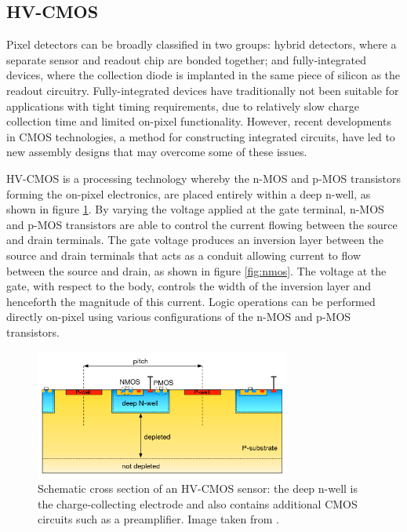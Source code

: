 \subsection{HV-CMOS}

Pixel detectors can be broadly classified in two groups: hybrid detectors, where a separate sensor and readout chip are bonded together; and fully-integrated devices, where the collection diode is implanted in the same piece of silicon as the readout circuitry.  Fully-integrated devices have traditionally not been suitable for applications with tight timing requirements, due to relatively slow charge collection time and limited on-pixel functionality.  However, recent developments in CMOS technologies, a method for constructing integrated circuits, have led to new assembly designs that may overcome some of these issues. 

HV-CMOS is a processing technology whereby the n-MOS and p-MOS transistors forming the on-pixel electronics, are placed entirely within a deep n-well, as shown in figure \ref{fig:hvcmos}.  By varying the voltage applied at the gate terminal, n-MOS and p-MOS transistors are able to control the current flowing between the source and drain terminals.  The gate voltage produces an inversion layer between the source and drain terminals that acts as a conduit allowing current to flow between the source and drain, as shown in figure \ref{fig:nmos}.  The voltage at the gate, with respect to the body, controls the width of the inversion layer and henceforth the magnitude of this current.  Logic operations can be performed directly on-pixel using various configurations of the n-MOS and p-MOS transistors.

\begin{figure}[h!]
\centering
\includegraphics[width=0.75\textwidth]{CLICdpVertex/Plots/HV-CMOSDiagram.png}
\caption[Schematic cross section of an HV-CMOS sensor: the deep n-well is the charge-collecting electrode and also contains additional CMOS circuits such as a preamplifier.  Image taken from \cite{Benoit:2016vup}.]{Schematic cross section of an HV-CMOS sensor: the deep n-well is the charge-collecting electrode and also contains additional CMOS circuits such as a preamplifier.  Image taken from \cite{Benoit:2016vup}.}\micro
\label{fig:hvcmos}
\end{figure}

